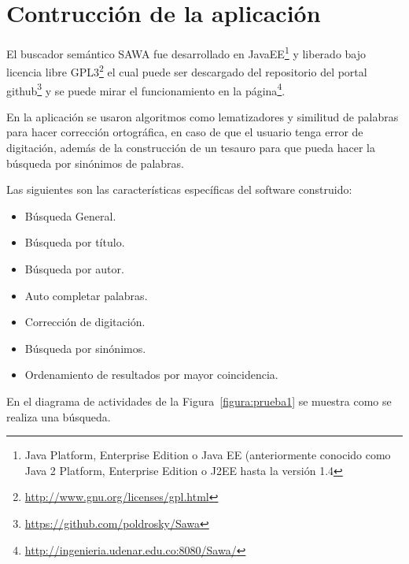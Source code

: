 \chapter{Contrucción de la aplicación}

El buscador semántico SAWA fue desarrollado en JavaEE\footnote{Java Platform, Enterprise Edition o Java EE
(anteriormente conocido como Java 2 Platform, Enterprise Edition o J2EE hasta la versión 1.4}
y liberado bajo licencia libre GPL3\footnote{\url{http://www.gnu.org/licenses/gpl.html}} el cual puede 
ser descargado del repositorio del portal github\footnote{\url{https://github.com/poldrosky/Sawa}} y
se puede mirar el funcionamiento en la página\footnote{\url{http://ingenieria.udenar.edu.co:8080/Sawa/}}. 

En la aplicación se usaron algoritmos  como lematizadores y similitud de palabras 
para hacer corrección ortográfica, en caso de que el usuario tenga error de digitación,
además de la construcción de un tesauro para que pueda hacer la búsqueda por sinónimos
de palabras.

Las siguientes son las características específicas del software construido:

\begin{itemize}
 \item Búsqueda General.
 \item Búsqueda por título.
 \item Búsqueda por autor.
 \item Auto completar palabras.
 \item Corrección de digitación.
 \item Búsqueda por sinónimos.
 \item Ordenamiento de resultados por mayor coincidencia.
\end{itemize}

En el diagrama de actividades de la Figura~\ref{figura:prueba1}  
se muestra como se realiza una búsqueda.

